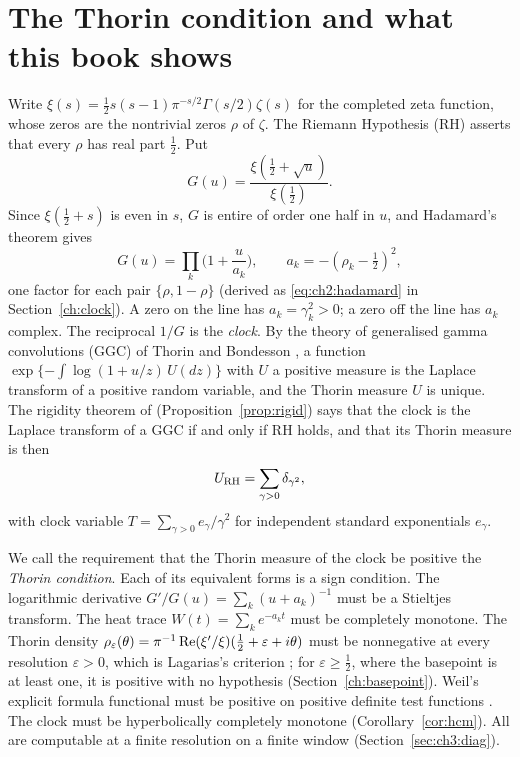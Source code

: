 \section{The Thorin condition and what this book shows}\label{ch:intro}

Write $\xi(s)=\frac12s(s-1)\pi^{-s/2}\Gamma(s/2)\zeta(s)$ for the completed zeta function, whose zeros are the nontrivial zeros $\rho$ of $\zeta$. The Riemann Hypothesis (RH) asserts that every $\rho$ has real part $\frac12$. Put
\[
G(u)=\frac{\xi(\frac12+\sqrt u)}{\xi(\frac12)} .
\]
Since $\xi(\frac12+s)$ is even in $s$, $G$ is entire of order one half in $u$, and Hadamard's theorem gives
\[
G(u)=\prod_k\Big(1+\frac u{a_k}\Big),\qquad a_k=-(\rho_k-\tfrac12)^2,
\]
one factor for each pair $\{\rho,1-\rho\}$ (derived as \eqref{eq:ch2:hadamard} in Section~\ref{ch:clock}). A zero on the line has $a_k=\gamma_k^2>0$; a zero off the line has $a_k$ complex. The reciprocal $1/G$ is the \emph{clock}. By the theory of generalised gamma convolutions (GGC) of Thorin and Bondesson \cite{Thorin77a,Thorin,Bondesson}, a function $\exp\{-\int\log(1+u/z)\,U(dz)\}$ with $U$ a positive measure is the Laplace transform of a positive random variable, and the Thorin measure $U$ is unique. The rigidity theorem of \cite{P26} (Proposition~\ref{prop:rigid}) says that the clock is the Laplace transform of a GGC if and only if RH holds, and that its Thorin measure is then
\begin{equation}\label{eq:URH}
U_{\mathrm{RH}}=\sum_{\gamma>0}\delta_{\gamma^2},
\end{equation}
with clock variable $T=\sum_{\gamma>0}e_\gamma/\gamma^2$ for independent standard exponentials $e_\gamma$.

We call the requirement that the Thorin measure of the clock be positive the \emph{Thorin condition}. Each of its equivalent forms is a sign condition. The logarithmic derivative $G'/G(u)=\sum_k(u+a_k)^{-1}$ must be a Stieltjes transform. The heat trace $W(t)=\sum_ke^{-a_kt}$ must be completely monotone. The Thorin density $\rho_\varepsilon(\theta)=\pi^{-1}\operatorname{Re}(\xi'/\xi)(\frac12+\varepsilon+i\theta)$ must be nonnegative at every resolution $\varepsilon>0$, which is Lagarias's criterion \cite{Lagarias}; for $\varepsilon\ge\frac12$, where the basepoint is at least one, it is positive with no hypothesis (Section~\ref{ch:basepoint}). Weil's explicit formula functional must be positive on positive definite test functions \cite{Weil52}. The clock must be hyperbolically completely monotone (Corollary~\ref{cor:hcm}). All are computable at a finite resolution on a finite window (Section~\ref{sec:ch3:diag}).

